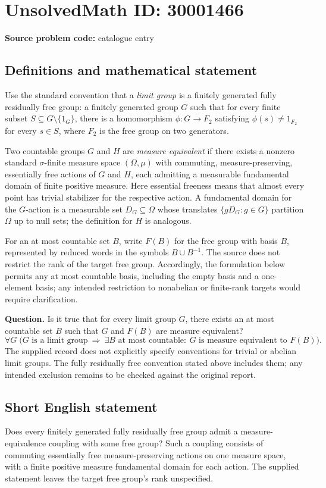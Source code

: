\documentclass[11pt]{article}
\begin{document}
\section*{UnsolvedMath ID: 30001466}
\textbf{Source problem code:} catalogue entry
\subsection{Definitions and mathematical statement}
Use the standard convention that a \emph{limit group} is a finitely generated fully residually free group: a finitely generated group \(G\) such that for every finite subset \(S\subseteq G\setminus\{1_G\}\), there is a homomorphism \(\phi:G\to F_2\) satisfying \(\phi(s)\ne 1_{F_2}\) for every \(s\in S\), where \(F_2\) is the free group on two generators.

Two countable groups \(G\) and \(H\) are \emph{measure equivalent} if there exists a nonzero standard \(\sigma\)-finite measure space \((\Omega,\mu)\) with commuting, measure-preserving, essentially free actions of \(G\) and \(H\), each admitting a measurable fundamental domain of finite positive measure. Here essential freeness means that almost every point has trivial stabilizer for the respective action. A fundamental domain for the \(G\)-action is a measurable set \(D_G\subseteq\Omega\) whose translates \(\{gD_G:g\in G\}\) partition \(\Omega\) up to null sets; the definition for \(H\) is analogous.

For an at most countable set \(B\), write \(F(B)\) for the free group with basis \(B\), represented by reduced words in the symbols \(B\cup B^{-1}\). The source does not restrict the rank of the target free group. Accordingly, the formulation below permits any at most countable basis, including the empty basis and a one-element basis; any intended restriction to nonabelian or finite-rank targets would require clarification.

\textbf{Question.} Is it true that for every limit group \(G\), there exists an at most countable set \(B\) such that \(G\) and \(F(B)\) are measure equivalent?
\[
\forall G\;\bigl(G\text{ is a limit group}\ \Longrightarrow\ \exists B\text{ at most countable}:\ G\text{ is measure equivalent to }F(B)\bigr).
\]
The supplied record does not explicitly specify conventions for trivial or abelian limit groups. The fully residually free convention stated above includes them; any intended exclusion remains to be checked against the original report.
\subsection{Short English statement}
Does every finitely generated fully residually free group admit a measure-equivalence coupling with some free group? Such a coupling consists of commuting essentially free measure-preserving actions on one measure space, with a finite positive measure fundamental domain for each action. The supplied statement leaves the target free group's rank unspecified.
\end{document}

